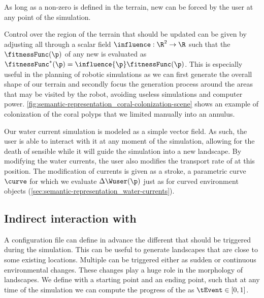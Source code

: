 As long as a non-zero  is defined in the terrain, new  can be forced by the user at any point of the simulation. 

Control over the region of the terrain that should be updated can be given by adjusting all  through a scalar field $\influence: \R^2 \to \R $ such that the  $\fitnessFunc(\p)$ of any new  is evaluated as $\fitnessFunc^*(\p) = \influence{\p} \fitnessFunc(\p)$. This is especially useful in the planning of robotic simulations as we can first generate the overall shape of our terrain and secondly focus the generation process around the areas that may be visited by the robot, avoiding useless simulations and computer power. 
\cref{fig:semantic-representation_coral-colonization-scene} shows an example of colonization of the coral polyps that we limited manually into an annulus.



Our water current simulation is modeled as a simple vector field. As such, the user is able to interact with it at any moment of the simulation, allowing for the death of sensible  while it will guide the simulation into a new landscape. By modifying the water currents, the user also modifies the transport rate of  at this position. The modification of currents is given as a stroke, a parametric curve $\curve$ for which we evaluate $\Delta \Wuser(\p)$ just as for curved environment objects (\cref{sec:semantic-representation_water-currents}).

\subsection{Indirect interaction with }
\label{sec:semantic-representation_events}
A configuration file can define in advance the different  that should be triggered during the simulation. This can be useful to generate landscapes that are close to some existing locations. 
Multiple  can be triggered either as sudden or continuous environmental changes. These changes play a huge role in the morphology of landscapes.
We define  with a starting point and an ending point, such that at any time of the simulation we can compute the progress of the  as $\tEvent \in [0, 1]$.

